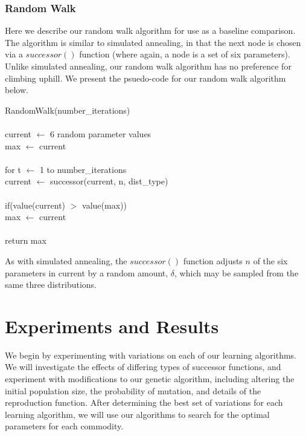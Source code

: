 \documentclass[12pt]{article}
\begin{document}
\subsubsection{Random Walk}

Here we describe our random walk algorithm for use as a baseline comparison.
The algorithm is similar to simulated annealing, in that the next node is
chosen via a $successor()$ function (where again, a node is a set of six
parameters). Unlike simulated annealing, our random walk algorithm has no
preference for climbing uphill. We present the psuedo-code for our random walk
algorithm below.

\vspace{10pt}
\setlength{\parindent}{5mm}
\indent RandomWalk(number\_iterations)\\\\
\indent \indent current $\leftarrow$ 6 random parameter values\\
\indent \indent max $\leftarrow$ current\\\\
\indent \indent for t $\leftarrow$ 1 to number\_iterations\\
\indent \indent \indent current $\leftarrow$ successor(current, n, dist\_type)\\\\
\indent \indent \indent if(value(current) $>$ value(max))\\
\indent \indent \indent \indent max $\leftarrow$ current\\\\
\indent \indent return max\\
\setlength{\parindent}{0mm}

As with simulated annealing, the $successor()$ function adjusts $n$ of the six
parameters in current by a random amount, $\delta$, which may be sampled from
the same three distributions.



\section{Experiments and Results}


We begin by experimenting with variations on each of our learning algorithms. We
will investigate the effects of differing types of successor functions, and
experiment with modifications to our genetic algorithm, including altering the
initial population size, the probability of mutation, and details of the
reproduction function. After determining the best set of variations for each
learning algorithm, we will use our algorithms to search for the optimal
parameters for each commodity.
\end{document}
